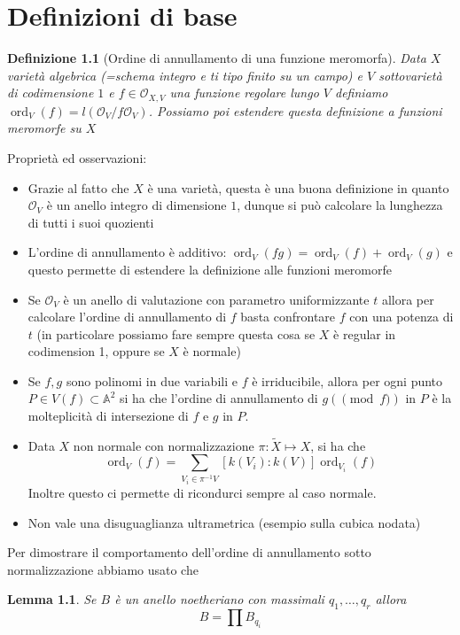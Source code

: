 \documentclass{amsbook}
\newcommand{\on}{\operatorname}
\newcommand{\AAA}{\mathbb{A}}
\newcommand{\OO}{\mathcal{O}}
\newcommand{\inv}{^{-1}}
\newcommand{\mm}{\mapsto}
\newtheorem{lem}{Lemma}
\newtheorem*{def*}{Definizione}
\theoremstyle{remark}
\begin{document}
\chapter{Definizioni di base}

\begin{def*}[Ordine di annullamento di una funzione meromorfa]
Data $X$ varietà algebrica (=schema integro e ti tipo finito su un campo) e $V$ sottovarietà di codimensione $1$ e $f \in \OO_{X,V}$ una funzione regolare lungo $V$ definiamo $\on{ord}_V(f)=l(\OO_V / f\OO_V)$. Possiamo poi estendere questa definizione a funzioni meromorfe su $X$ 
\end{def*}

Proprietà ed osservazioni:
\begin{itemize}
\item Grazie al fatto che $X$ è una varietà, questa è una buona definizione in quanto $\OO_V$ è un anello integro di dimensione $1$, dunque si può calcolare la lunghezza di tutti i suoi quozienti 
\item L'ordine di annullamento è additivo: $\on{ord}_V(fg)=\on{ord}_V(f)+\on{ord}_V(g)$  e questo permette di estendere la definizione alle funzioni meromorfe
\item Se $\OO_V$ è un anello di valutazione con parametro uniformizzante $t$ allora per calcolare l'ordine di annullamento di $f$ basta confrontare $f$ con una potenza di $t$ (in particolare possiamo fare sempre questa cosa se $X$ è regular in codimension 1, oppure se $X$ è normale)
\item Se $f,g$ sono polinomi in due variabili e $f$ è irriducibile, allora per ogni punto $P \in V(f)\subset \AAA^2$  si ha che l'ordine di annullamento di $g(\pmod f)$ in $P$ è la molteplicità di intersezione di $f$ e $g$ in $P$.
\item Data $X$ non normale con normalizzazione $\pi:\widetilde{X}\mm X$, si ha che 
$$\on{ord}_V(f)= \sum_{V_i \in \pi\inv V}[k(V_i):k(V)]\on{ord}_{V_i}(f)$$
Inoltre questo ci permette di ricondurci sempre al caso normale.
\item Non vale una disuguaglianza ultrametrica (esempio sulla cubica nodata)
\end{itemize}

Per dimostrare il comportamento dell'ordine di annullamento sotto normalizzazione abbiamo usato che 
\begin{lem}
Se $B$ è un anello noetheriano con massimali $q_1,\dots,q_r$ allora 
$$ B= \prod B_{q_i}$$
\end{lem}
\end{document}
